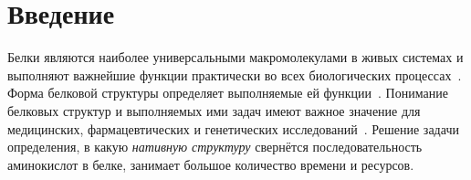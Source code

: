 \documentclass[14pt]{extarticle}
\begin{document}
\newpage


\section*{Введение}
\label{sec:intro}
	
	Белки являются наиболее универсальными макромолекулами в живых системах и выполняют важнейшие функции практически во всех биологических процессах~\cite{berg2002biochemistry}. 
	Форма белковой структуры определяет выполняемые ей функции~\cite{berg2002biochemistry}. Понимание белковых структур и выполняемых ими задач имеют важное значение для медицинских, фармацевтических и генетических исследований~\cite{Baldassarre2019GraphQAPM}. Решение задачи определения, в какую \textit{нативную структуру} свернётся последовательность аминокислот в белке, занимает большое количество времени и ресурсов.
\end{document}
